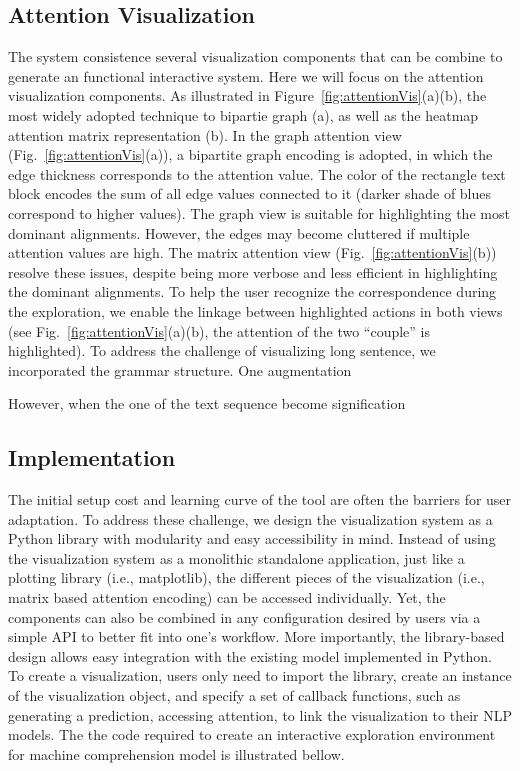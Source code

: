 \subsection{Attention Visualization}
The system consistence several visualization components that can be combine to generate an functional interactive system. Here we will focus on the attention visualization components. 
As illustrated in Figure~\ref{fig:attentionVis}(a)(b), the most widely adopted technique to bipartie graph (a), as well as the heatmap attention matrix representation (b). 
%
In the graph attention view (Fig.~\ref{fig:attentionVis}(a)), a bipartite graph encoding is adopted, in which the edge thickness corresponds to the attention value. The color of the rectangle text block encodes the sum of all edge values connected to it (darker shade of blues correspond to higher values).
The graph view is suitable for highlighting the most dominant alignments. However, the edges may become cluttered if multiple attention values are high. The matrix attention view (Fig.~\ref{fig:attentionVis}(b)) resolve these issues, despite being more verbose and less efficient in highlighting the dominant alignments. 
To help the user recognize the correspondence during the exploration, we enable the linkage between highlighted actions in both views (see Fig.~\ref{fig:attentionVis}(a)(b), the attention of the two ``couple'' is highlighted).
%
To address the challenge of visualizing long sentence, we incorporated the grammar structure.
One augmentation 

However, when the one of the text sequence become signification 

\subsection{Implementation}
The initial setup cost and learning curve of the tool are often the barriers for user adaptation. To address these challenge, we design the visualization system as a Python library with modularity and easy accessibility in mind.
Instead of using the visualization system as a monolithic standalone application, just like a plotting library (i.e., matplotlib), the different pieces of the visualization (i.e., matrix based attention encoding) can be accessed individually.
% 
Yet, the components can also be combined in any configuration desired by users via a simple API to better fit into one's workflow.
More importantly, the library-based design allows easy integration with the existing model implemented in Python.
%
To create a visualization, users only need to import the library, create an instance of the visualization object, and specify a set of callback functions, such as generating a prediction, accessing attention, to link the visualization to their NLP models. The the code required to create an interactive exploration environment for machine comprehension model is illustrated bellow.

